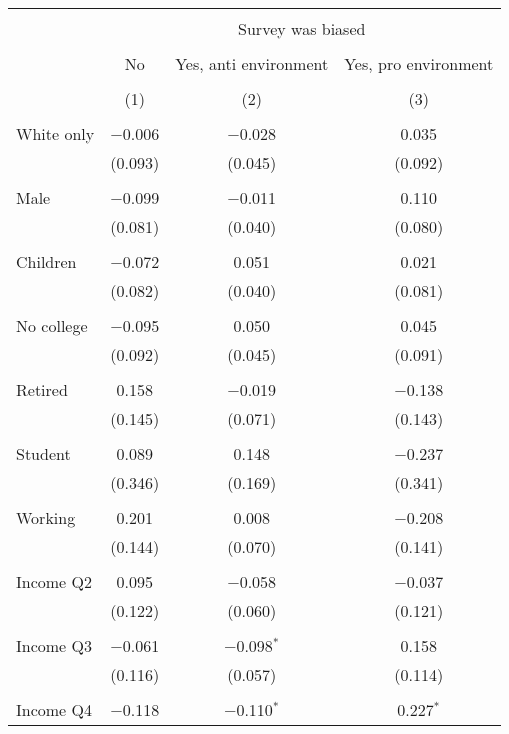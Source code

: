 
\begin{tabular}{@{\extracolsep{5pt}}lccc} 
\\[-1.8ex]\hline 
\hline \\[-1.8ex] 
 & \multicolumn{3}{c}{Survey was biased} \\ 
\cline{2-4} 
\\[-1.8ex] & No & Yes, anti environment & Yes, pro environment \\ 
\\[-1.8ex] & (1) & (2) & (3)\\ 
\hline \\[-1.8ex] 
 White only & $-$0.006 & $-$0.028 & 0.035 \\ 
  & (0.093) & (0.045) & (0.092) \\ 
  & & & \\ 
 Male & $-$0.099 & $-$0.011 & 0.110 \\ 
  & (0.081) & (0.040) & (0.080) \\ 
  & & & \\ 
 Children & $-$0.072 & 0.051 & 0.021 \\ 
  & (0.082) & (0.040) & (0.081) \\ 
  & & & \\ 
 No college & $-$0.095 & 0.050 & 0.045 \\ 
  & (0.092) & (0.045) & (0.091) \\ 
  & & & \\ 
 Retired & 0.158 & $-$0.019 & $-$0.138 \\ 
  & (0.145) & (0.071) & (0.143) \\ 
  & & & \\ 
 Student & 0.089 & 0.148 & $-$0.237 \\ 
  & (0.346) & (0.169) & (0.341) \\ 
  & & & \\ 
 Working & 0.201 & 0.008 & $-$0.208 \\ 
  & (0.144) & (0.070) & (0.141) \\ 
  & & & \\ 
 Income Q2 & 0.095 & $-$0.058 & $-$0.037 \\ 
  & (0.122) & (0.060) & (0.121) \\ 
  & & & \\ 
 Income Q3 & $-$0.061 & $-$0.098$^{*}$ & 0.158 \\ 
  & (0.116) & (0.057) & (0.114) \\ 
  & & & \\ 
 Income Q4 & $-$0.118 & $-$0.110$^{*}$ & 0.227$^{*}$ \\ 

\end{tabular}
